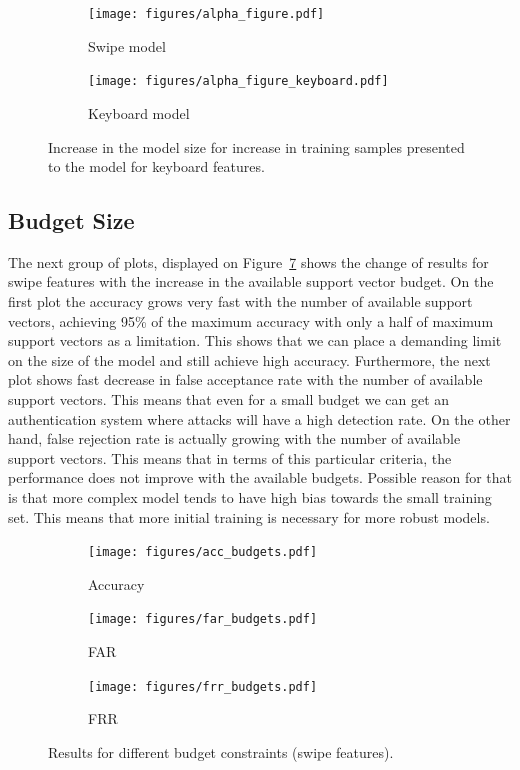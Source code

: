 \documentclass{llncs}
\begin{document}
\begin{figure}[!t]
\centering
\begin{subfigure}{0.45\textwidth}

   \texttt{[image: figures/alpha\_figure.pdf]}
  \caption{Swipe model}    
  \label{fig:modelgrowthswipes}
\end{subfigure}
\begin{subfigure}{0.45\textwidth}
 \texttt{[image: figures/alpha\_figure\_keyboard.pdf]}
  \caption{Keyboard model}    
  \label{fig:modelgrowthkeyboard}
  \end{subfigure}
    \caption{Increase in the model size for increase in training samples presented to the model for keyboard features.}    
      \label{fig:modelgrowth}
    
\end{figure}

\subsection{Budget Size}

The next group of plots, displayed on Figure~\ref{fig:budgets_swipes} shows the change of results for swipe features with the increase in the available support vector budget. On the first plot the accuracy grows very fast with the number of available support vectors, achieving 95\% of the maximum accuracy with only a half of maximum support vectors as a limitation. This shows that we can place a demanding limit on the size of the model and still achieve high accuracy. Furthermore, the next plot shows fast decrease in false acceptance rate with the number of available support vectors. This means that even for a small budget we can get an authentication system where attacks will have a high detection rate. 
On the other hand, false rejection rate is actually growing with the number of available support vectors. This means that in terms of this particular criteria, the performance does not improve with the available budgets. Possible reason for that is that more complex model tends to have high bias towards the small training set. This means that more initial training is necessary for more robust models.

\begin{figure}[!t]
    \centering
    \begin{subfigure}{0.32\textwidth}
        \texttt{[image: figures/acc\_budgets.pdf]}
        \caption{Accuracy}
        \label{fig:accuracy}
    \end{subfigure}
    \hfill
    \begin{subfigure}{0.32\textwidth}
        \texttt{[image: figures/far\_budgets.pdf]}
        \caption{FAR}
        \label{fig:far}
    \end{subfigure}
    \hfill
    \begin{subfigure}{0.32\textwidth}
        \texttt{[image: figures/frr\_budgets.pdf]}
        \caption{FRR}
        \label{fig:frr}
    \end{subfigure}
    \caption{Results for different budget constraints (swipe features).}
\label{fig:budgets_swipes}
\end{figure}
\end{document}
